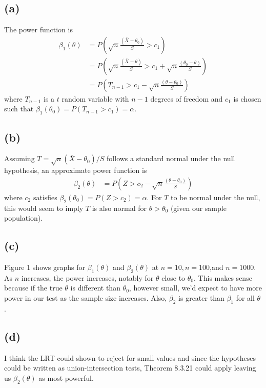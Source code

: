 \documentclass[12pt]{article}
\begin{document}
\subsection*{(a)}

\noindent The power function is
\begin{align*}
\beta_1(\theta) &= P\left(\sqrt{n}\frac{(\bar X - \theta_0)}{S} > c_1\right) \\
    &= P\left(\sqrt{n}\frac{(\bar X - \theta)}{S} > c_1 + \sqrt{n}\frac{(\theta_0-\theta)}{S}\right) \\
    &= P\left(T_{n-1} > c_1 - \sqrt{n}\frac{(\theta-\theta_0)}{S}\right)
\end{align*}
\noindent where $T_{n-1}$ is a $t$ random variable with $n-1$ degrees of freedom and $c_1$ is chosen such that $\beta_1(\theta_0)=P(T_{n-1} > c_1) = \alpha$.

\subsection*{(b)}

\noindent Assuming $T=\sqrt{n}(\bar X - \theta_0)/S$ follows a standard normal under the null hypothesis, an approximate power function is
\begin{align*}
\beta_2(\theta) &= P\left(Z > c_2 - \sqrt{n}\frac{(\theta-\theta_0)}{S}\right)
\end{align*}
\noindent where $c_2$ satisfies $\beta_2(\theta_0)=P(Z>c_2)=\alpha$. For $T$ to be normal under the null, this would seem to imply $T$ is also normal for $\theta > \theta_0$ (given our sample population).

\subsection*{(c)}

\noindent Figure 1 shows graphs for $\beta_1(\theta)$ and $\beta_2(\theta)$ at $n=10,n=100$,and $n=1000$. As $n$ increases, the power increases, notably for $\theta$ close to $\theta_0$. This makes sense because if the true $\theta$ is different than $\theta_0$, however small, we'd expect to have more power in our test as the sample size increases. Also, $\beta_2$ is greater than $\beta_1$ for all $\theta$.

\subsection*{(d)}

\noindent I think the LRT could shown to reject for small values and since the hypotheses could be written as union-intersection tests, Theorem 8.3.21 could apply leaving us $\beta_2(\theta)$ as most powerful.
\end{document}
